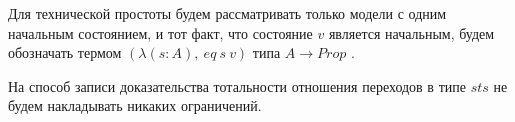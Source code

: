 \documentclass[12pt]{article}
\begin{document}
Для технической простоты будем рассматривать только модели с одним начальным состоянием, и тот факт, что состояние $v$ является начальным, будем обозначать термом $(\lambda (s:A),\ eq\ s\ v)$ типа $ A \xrightarrow{} Prop$ .

На способ записи доказательства тотальности отношения переходов в типе $sts$ не будем накладывать никаких ограничений.







\end{document}
